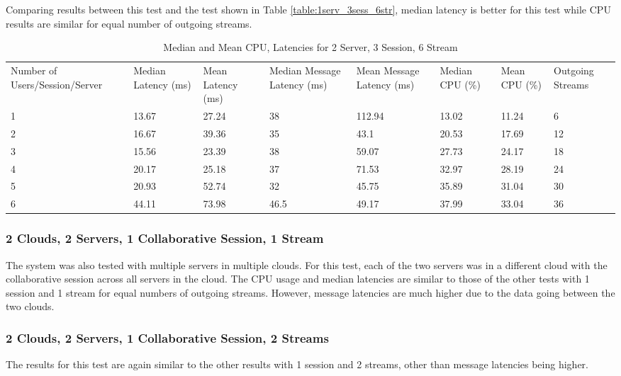Comparing results between this test and the test shown in Table \ref{table:1serv_3sess_6str}, median latency is better for this test while CPU results are similar for equal number of outgoing streams.
 
\begin{table}
\caption{Median and Mean CPU, Latencies for 2 Server, 3 Session, 6 Stream}
\label{table:2serv_3sess_6str}
\begin{tabu} to\linewidth{|X[c]|X[c]|X[c]|X[c]|X[c]|X[c]|X[c]|X[c]|}
\everyrow{\hline}
\hline
Number of Users/Session/Server & Median Latency (ms) & Mean Latency (ms) & Median Message Latency (ms) & Mean Message Latency (ms) & Median CPU (\%) & Mean CPU (\%) & Outgoing Streams\\
1 & 13.67 & 27.24 & 38 & 112.94 & 13.02 & 11.24 & 6 \\
2 & 16.67 & 39.36 & 35 & 43.1 & 20.53 & 17.69 & 12 \\
3 & 15.56 & 23.39 & 38 & 59.07 & 27.73 & 24.17 & 18 \\
4 & 20.17 & 25.18 & 37 & 71.53 & 32.97 & 28.19 & 24 \\
5 & 20.93 & 52.74 & 32 & 45.75 & 35.89 & 31.04 & 30 \\
6 & 44.11 & 73.98 & 46.5 & 49.17 & 37.99 & 33.04 & 36 \\
\end{tabu}
\end{table}

\subsubsection{2 Clouds, 2 Servers, 1 Collaborative Session, 1 Stream}

The system was also tested with multiple servers in multiple clouds. For this test, each of the two servers was in a different cloud with the collaborative session across all servers in the cloud. The CPU usage and median latencies are similar to those of the other tests with 1 session and 1 stream for equal numbers of outgoing streams. However, message latencies are much higher due to the data going between the two clouds.

\subsubsection{2 Clouds, 2 Servers, 1 Collaborative Session, 2 Streams}

The results for this test are again similar to the other results with 1 session and 2 streams, other than message latencies being higher.

